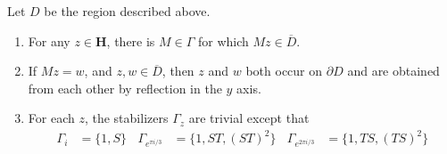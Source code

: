 \begin{theorem}
    Let $D$ be the region described above.
    \begin{enumerate}
        \item For any $z \in \mathbf{H}$, there is $M \in \Gamma$ for which $Mz \in \overline{D}$.
        \item If $Mz = w$, and $z,w \in \overline{D}$, then $z$ and $w$ both occur on $\partial D$ and are obtained from each other by reflection in the $y$ axis.
        \item For each $z$, the stabilizers $\Gamma_z$ are trivial except that
        \begin{align*}
            \Gamma_i &= \{ 1, S \}\ \ \ \ \Gamma_{e^{\pi i/3}} &= \{ 1, ST, (ST)^2 \}\ \ \ \ \Gamma_{e^{2 \pi i/3}} &= \{ 1, TS, (TS)^2 \}
        \end{align*}
    \end{enumerate}
\end{theorem}
